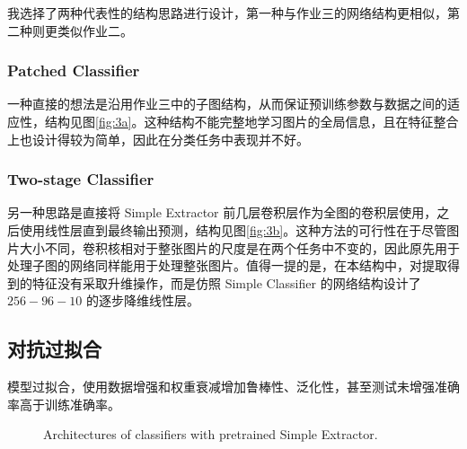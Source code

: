 \documentclass[a4paper]{article}
\begin{document}
我选择了两种代表性的结构思路进行设计，第一种与作业三的网络结构更相似，第二种则更类似作业二。
\subsubsection{Patched Classifier}
一种直接的想法是沿用作业三中的子图结构，从而保证预训练参数与数据之间的适应性，结构见图\ref{fig:3a}。这种结构不能完整地学习图片的全局信息，且在特征整合上也设计得较为简单，因此在分类任务中表现并不好。
\subsubsection{Two-stage Classifier}
另一种思路是直接将 Simple Extractor 前几层卷积层作为全图的卷积层使用，之后使用线性层直到最终输出预测，结构见图\ref{fig:3b}。这种方法的可行性在于尽管图片大小不同，卷积核相对于整张图片的尺度是在两个任务中不变的，因此原先用于处理子图的网络同样能用于处理整张图片。值得一提的是，在本结构中，对提取得到的特征没有采取升维操作，而是仿照 Simple Classifier 的网络结构设计了 $256-96-10$ 的逐步降维线性层。

\subsection{对抗过拟合}
模型过拟合，使用数据增强和权重衰减增加鲁棒性、泛化性，甚至测试未增强准确率高于训练准确率。

\begin{figure}[H]
    \centering
    
    \caption{Architectures of classifiers with pretrained Simple Extractor.}
\end{figure}
\end{document}
